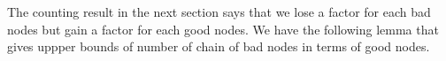 \begin{defn}
\begin{enumerate}

        
    \end{enumerate}
\end{defn}

The counting result in the next section says that we lose a factor for each bad nodes but gain a factor for each good nodes. We have the following lemma that gives uppper bounds of number of chain of bad nodes in terms of good nodes.

